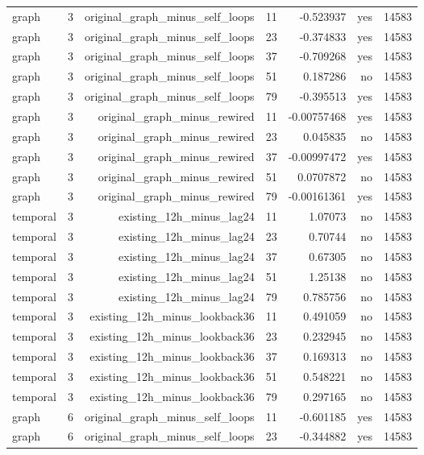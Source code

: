 \begin{tabular}{lrrrrrr}
graph & 3 & original\_graph\_minus\_self\_loops & 11 & -0.523937 & yes & 14583 \\
graph & 3 & original\_graph\_minus\_self\_loops & 23 & -0.374833 & yes & 14583 \\
graph & 3 & original\_graph\_minus\_self\_loops & 37 & -0.709268 & yes & 14583 \\
graph & 3 & original\_graph\_minus\_self\_loops & 51 & 0.187286 & no & 14583 \\
graph & 3 & original\_graph\_minus\_self\_loops & 79 & -0.395513 & yes & 14583 \\
graph & 3 & original\_graph\_minus\_rewired & 11 & -0.00757468 & yes & 14583 \\
graph & 3 & original\_graph\_minus\_rewired & 23 & 0.045835 & no & 14583 \\
graph & 3 & original\_graph\_minus\_rewired & 37 & -0.00997472 & yes & 14583 \\
graph & 3 & original\_graph\_minus\_rewired & 51 & 0.0707872 & no & 14583 \\
graph & 3 & original\_graph\_minus\_rewired & 79 & -0.00161361 & yes & 14583 \\
temporal & 3 & existing\_12h\_minus\_lag24 & 11 & 1.07073 & no & 14583 \\
temporal & 3 & existing\_12h\_minus\_lag24 & 23 & 0.70744 & no & 14583 \\
temporal & 3 & existing\_12h\_minus\_lag24 & 37 & 0.67305 & no & 14583 \\
temporal & 3 & existing\_12h\_minus\_lag24 & 51 & 1.25138 & no & 14583 \\
temporal & 3 & existing\_12h\_minus\_lag24 & 79 & 0.785756 & no & 14583 \\
temporal & 3 & existing\_12h\_minus\_lookback36 & 11 & 0.491059 & no & 14583 \\
temporal & 3 & existing\_12h\_minus\_lookback36 & 23 & 0.232945 & no & 14583 \\
temporal & 3 & existing\_12h\_minus\_lookback36 & 37 & 0.169313 & no & 14583 \\
temporal & 3 & existing\_12h\_minus\_lookback36 & 51 & 0.548221 & no & 14583 \\
temporal & 3 & existing\_12h\_minus\_lookback36 & 79 & 0.297165 & no & 14583 \\
graph & 6 & original\_graph\_minus\_self\_loops & 11 & -0.601185 & yes & 14583 \\
graph & 6 & original\_graph\_minus\_self\_loops & 23 & -0.344882 & yes & 14583 \\

\end{tabular}

